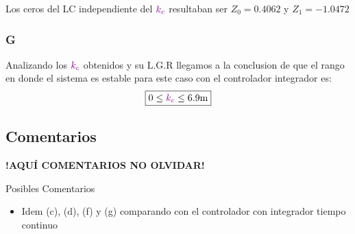 Los ceros del LC independiente del \(\mathbin{\color{violet}k_c}\) resultaban ser $Z_{0} = 0.4062 $ y $Z_{1} = -1.0472$ 

\FloatBarrier
\subsubsection{G}%
 Analizando los \(\mathbin{\color{violet}k_c}\) obtenidos y su L.G.R llegamos a la
conclusion de que el rango en donde el sistema es estable para este caso con el controlador integrador es:
\begin{equation}
  \boxed{ 0 \leq \mora{k_{c}} \leq 6.9\unit{m} }
\end{equation}

\FloatBarrier
\subsection{Comentarios}


\textbf{!AQUÍ COMENTARIOS NO OLVIDAR!}

Posibles Comentarios
\begin{itemize}
    \item Idem (c), (d), (f) y (g) comparando con el controlador con integrador tiempo continuo
\end{itemize}
